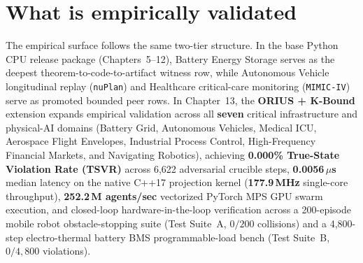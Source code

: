 \section{What is empirically validated}
The empirical surface follows the same two-tier structure. In the base Python CPU release package
(Chapters~5--12), Battery Energy Storage serves as the deepest theorem-to-code-to-artifact witness
row, while Autonomous Vehicle longitudinal replay (\texttt{nuPlan}) and Healthcare critical-care
monitoring (\texttt{MIMIC-IV}) serve as promoted bounded peer rows. In Chapter~13, the
\textbf{ORIUS + K-Bound} extension expands empirical validation across all \textbf{seven} critical
infrastructure and physical-AI domains (Battery Grid, Autonomous Vehicles, Medical ICU, Aerospace
Flight Envelopes, Industrial Process Control, High-Frequency Financial Markets, and Navigating
Robotics), achieving \textbf{0.000\% True-State Violation Rate (TSVR)} across 6,622 adversarial
crucible steps, \textbf{0.0056\,$\mu$s} median latency on the native C++17 projection kernel
(\textbf{177.9\,MHz} single-core throughput), \textbf{252.2\,M agents/sec} vectorized PyTorch MPS
GPU swarm execution, and closed-loop hardware-in-the-loop verification across a 200-episode mobile
robot obstacle-stopping suite (Test Suite~A, $0/200$ collisions) and a 4,800-step electro-thermal
battery BMS programmable-load bench (Test Suite~B, $0/4,800$ violations).

